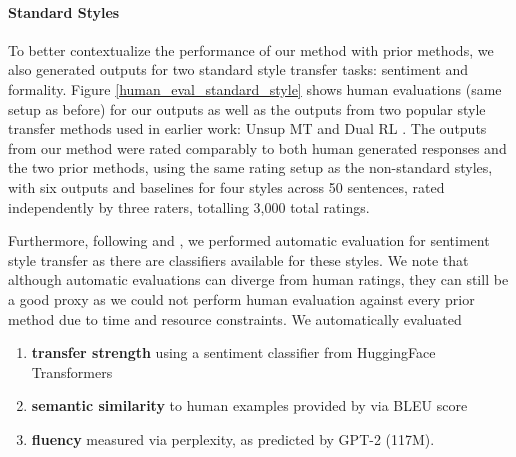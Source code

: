 \paragraph{Standard Styles}
To better contextualize the performance of our method with prior methods, we also generated outputs for two standard style transfer tasks: sentiment and formality. 
Figure \ref{human_eval_standard_style} shows human evaluations (same setup as before) for our outputs as well as the outputs from two popular style transfer methods used in earlier work: Unsup MT \citep{prabhumoye-etal-2018-style} and Dual RL \citep{DBLP:conf/ijcai/LuoLZYCSS19}.
The outputs from our method were rated comparably to both human generated responses and the two prior methods, using the same rating setup as the non-standard styles, with six outputs and baselines for four styles across 50 sentences, rated independently by three raters, totalling 3,000 total ratings.

Furthermore, following \citet{li-etal-2018-delete} and \citet{sudhakar-etal-2019-transforming}, we performed automatic evaluation for sentiment style transfer as there are classifiers available for these styles. We note that although automatic evaluations can diverge from human ratings, they can still be a good proxy as we could not perform human evaluation against every prior method due to time and resource constraints.
We automatically evaluated
\begin{enumerate}
    \item \textbf{transfer strength} using a sentiment classifier from HuggingFace Transformers \citep{wolf-etal-2020-transformers}
    \item \textbf{semantic similarity} to human examples provided by \citet{DBLP:conf/ijcai/LuoLZYCSS19} via BLEU score
    \item \textbf{fluency} measured via perplexity, as predicted by GPT-2 (117M).
\end{enumerate}

